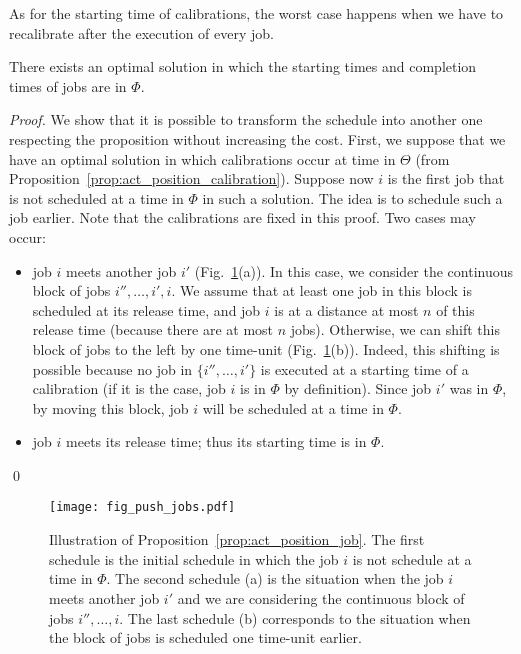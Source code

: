 As for the starting time of calibrations, the worst case happens when we have to recalibrate after the execution of every job.


\begin{prop}\label{prop:act_position_job}
There exists an optimal solution in which the starting times and completion times of jobs are in $\Phi$.
\end{prop}

\begin{proof}
We show that it is possible to transform the schedule into another one respecting the proposition without increasing the cost. First, we suppose that we have an optimal solution in which calibrations occur at time in $\Theta$ (from Proposition~\ref{prop:act_position_calibration}). Suppose now $i$ is the first job that is not scheduled at a time in $\Phi$ in such a solution. The idea is to schedule such a job earlier. Note that the calibrations are fixed in this proof. Two cases may occur:
\begin{itemize}
\item job $i$ meets another job $i'$ (Fig.~\ref{fig:push_jobs}(a)). In this case, we consider the continuous block of jobs $i'',\ldots, i',i$. We assume that at least one job in this block is scheduled at its release time, and job $i$ is at a distance at most $n$ of this release time (because there are at most $n$ jobs). Otherwise, we can shift this block of jobs to the left by one time-unit (Fig.~\ref{fig:push_jobs}(b)). Indeed, this shifting is possible because no job in $\{i'',\ldots,i'\}$ is executed at a starting time of a calibration (if it is the case, job $i$ is in $\Phi$ by definition). Since job $i'$ was in $\Phi$, by moving this block, job $i$ will be scheduled at a time in $\Phi$.
\item job $i$ meets its release time; thus its starting time is in $\Phi$.
\end{itemize}
\qed\end{proof}


\begin{figure}
\centering
\texttt{[image: fig\_push\_jobs.pdf]}
\caption{Illustration of Proposition~\ref{prop:act_position_job}. The first schedule is the initial schedule in which the job $i$ is not schedule at a time in $\Phi$. The second schedule (a) is the situation when the job $i$ meets another job $i'$ and we are considering the continuous block of jobs $i'',\ldots,i $. The last schedule (b) corresponds to the situation when the block of jobs is scheduled one time-unit earlier.}
\label{fig:push_jobs}
\end{figure}



